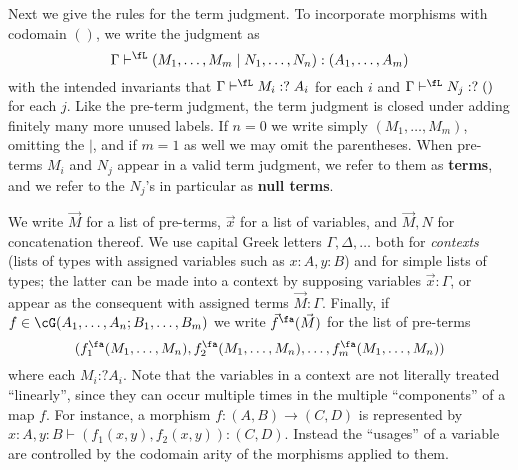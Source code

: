 \documentclass{book}
\let\types\vdash
\newcommand{\pc}{\mathrel{\mathord{:}?}}
\begin{document}
Next we give the rules for the term judgment.
To incorporate morphisms with codomain $()$, we write the judgment as
\[\Gamma \types^\fL (M_1,\dots,M_m\mid N_1,\dots,N_n):(A_1,\dots,A_m)\]
with the intended invariants that $\Gamma\types^{\fL} M_i\pc A_i$ for each $i$ and $\Gamma\types^{\fL} N_j\pc ()$ for each $j$.
Like the pre-term judgment, the term judgment is closed under adding finitely many more unused labels.
If $n=0$ we write simply $(M_1,\dots,M_m)$, omitting the $|$, and if $m=1$ as well we may omit the parentheses.
When pre-terms $M_i$ and $N_j$ appear in a valid term judgment, we refer to them as \textbf{terms}, and we refer to the $N_j$'s in particular as \textbf{null terms}.

We write $\vec M$ for a list of pre-terms, $\vec{x}$ for a list of variables, and $\vec M,N$ for concatenation thereof.
We use capital Greek letters $\Gamma,\Delta,\dots$ both for \emph{contexts} (lists of types with assigned variables such as $x:A,y:B$) and for simple lists of types; the latter can be made into a context by supposing variables $\vec{x}:\Gamma$, or appear as the consequent with assigned terms $\vec{M}:\Gamma$.
Finally, if $f\in\cG(A_1,\dots,A_n;B_1,\dots,B_m)$ we write $\vec{f}^\fa(\vec{M})$ for the list of pre-terms
\[(f_1^\fa(M_1,\dots,M_n),f_2^\fa(M_1,\dots,M_n),\dots,f_m^\fa(M_1,\dots,M_n))\]
where each $M_i \pc A_i$.
Note that the variables in a context are not literally treated ``linearly'', since they can occur multiple times in the multiple ``components'' of a map $f$.
For instance, a morphism $f:(A,B)\to (C,D)$ is represented by $x:A, y:B \types (f_1(x,y),f_2(x,y)):(C,D)$.
Instead the ``usages'' of a variable are controlled by the codomain arity of the morphisms applied to them.
\end{document}
